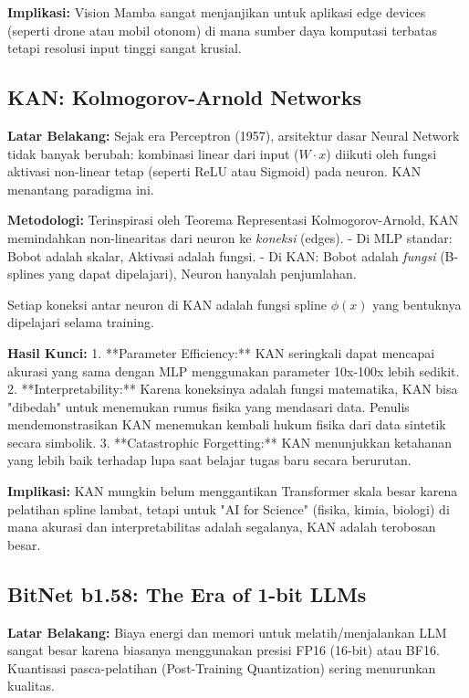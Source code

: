 \textbf{Implikasi:}
Vision Mamba sangat menjanjikan untuk aplikasi edge devices (seperti drone atau mobil otonom) di mana sumber daya komputasi terbatas tetapi resolusi input tinggi sangat krusial.

\subsection{KAN: Kolmogorov-Arnold Networks \cite{liu2024kan}}

\textbf{Latar Belakang:}
Sejak era Perceptron (1957), arsitektur dasar Neural Network tidak banyak berubah: kombinasi linear dari input ($W \cdot x$) diikuti oleh fungsi aktivasi non-linear tetap (seperti ReLU atau Sigmoid) pada neuron. KAN menantang paradigma ini.

\textbf{Metodologi:}
Terinspirasi oleh Teorema Representasi Kolmogorov-Arnold, KAN memindahkan non-linearitas dari neuron ke \textit{koneksi} (edges).
- Di MLP standar: Bobot adalah skalar, Aktivasi adalah fungsi.
- Di KAN: Bobot adalah \textit{fungsi} (B-splines yang dapat dipelajari), Neuron hanyalah penjumlahan.

Setiap koneksi antar neuron di KAN adalah fungsi spline $\phi(x)$ yang bentuknya dipelajari selama training.

\textbf{Hasil Kunci:}
1.  **Parameter Efficiency:** KAN seringkali dapat mencapai akurasi yang sama dengan MLP menggunakan parameter 10x-100x lebih sedikit.
2.  **Interpretability:** Karena koneksinya adalah fungsi matematika, KAN bisa "dibedah" untuk menemukan rumus fisika yang mendasari data. Penulis mendemonstrasikan KAN menemukan kembali hukum fisika dari data sintetik secara simbolik.
3.  **Catastrophic Forgetting:** KAN menunjukkan ketahanan yang lebih baik terhadap lupa saat belajar tugas baru secara berurutan.

\textbf{Implikasi:}
KAN mungkin belum menggantikan Transformer skala besar karena pelatihan spline lambat, tetapi untuk "AI for Science" (fisika, kimia, biologi) di mana akurasi dan interpretabilitas adalah segalanya, KAN adalah terobosan besar.

\subsection{BitNet b1.58: The Era of 1-bit LLMs \cite{wang2024bitnet}}

\textbf{Latar Belakang:}
Biaya energi dan memori untuk melatih/menjalankan LLM sangat besar karena biasanya menggunakan presisi FP16 (16-bit) atau BF16. Kuantisasi pasca-pelatihan (Post-Training Quantization) sering menurunkan kualitas.

